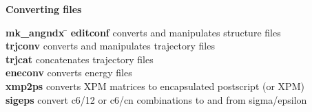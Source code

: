 \begin{description}
\item {\large\bf Converting files}
\vspace{-2ex}\begin{tabbing}
{\bf mk\_angndx} \= \kill
{\bf editconf} \> converts and manipulates structure files \\
{\bf trjconv} \> converts and manipulates trajectory files \\
{\bf trjcat} \> concatenates trajectory files \\
{\bf eneconv} \> converts energy files \\
{\bf xmp2ps} \> converts XPM matrices to encapsulated postscript (or XPM) \\
{\bf sigeps} \> convert c6/12 or c6/cn combinations to and from sigma/epsilon \\
\end{tabbing}\vspace{-2ex}


\end{description}
